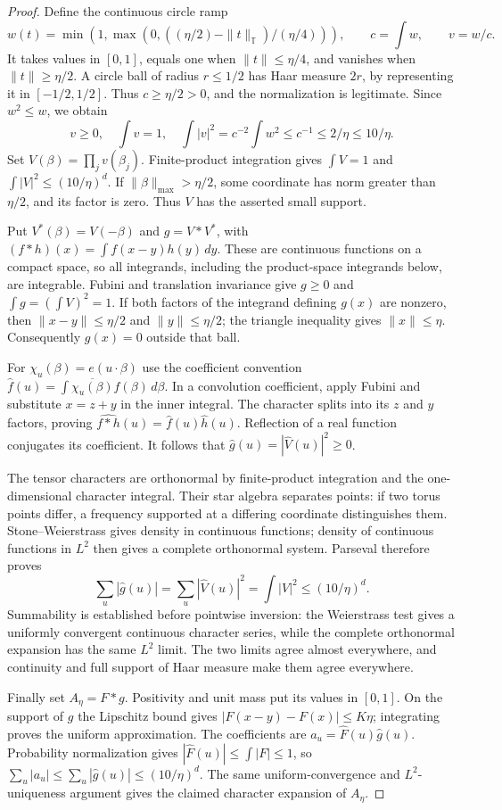 \begin{proof}
Define the continuous circle ramp
\[
 w(t)=\min(1,\max(0,((\eta/2)-\|t\|_{\mathbb T})/(\eta/4))),
 \qquad c=\int w,\qquad v=w/c.
\]
It takes values in $[0,1]$, equals one when $\|t\|\leq\eta/4$, and
vanishes when $\|t\|\geq\eta/2$.  A circle ball of radius
$r\leq1/2$ has Haar measure $2r$, by representing it in $[-1/2,1/2]$.
Thus $c\geq\eta/2>0$, and the normalization is legitimate.
Since $w^2\leq w$, we obtain
\[
 v\geq0,\quad\int v=1,\quad
 \int|v|^2=c^{-2}\int w^2\leq c^{-1}\leq2/\eta\leq10/\eta.
\]
Set $V(\beta)=\prod_jv(\beta_j)$.  Finite-product integration gives
$\int V=1$ and $\int|V|^2\leq(10/\eta)^d$.
If $\|\beta\|_{\max}>\eta/2$, some coordinate has norm greater than
$\eta/2$, and its factor is zero.  Thus $V$ has the asserted small support.

Put $V^*(\beta)=V(-\beta)$ and $g=V*V^*$, with
$(f*h)(x)=\int f(x-y)h(y)\,dy$.
These are continuous functions on a compact space, so all integrands,
including the product-space integrands below, are integrable.
Fubini and translation invariance give $g\geq0$ and $\int g=(\int V)^2=1$.
If both factors of the integrand defining $g(x)$ are nonzero, then
$\|x-y\|\leq\eta/2$ and $\|y\|\leq\eta/2$; the triangle inequality gives
$\|x\|\leq\eta$.  Consequently $g(x)=0$ outside that ball.

For $\chi_u(\beta)=e(u\cdot\beta)$ use the coefficient convention
$\widehat f(u)=\int\overline{\chi_u(\beta)}f(\beta)\,d\beta$.
In a convolution coefficient, apply Fubini and substitute $x=z+y$ in
the inner integral.  The character splits into its $z$ and $y$ factors,
proving $\widehat{f*h}(u)=\widehat f(u)\widehat h(u)$.
Reflection of a real function conjugates its coefficient.  It follows that
$\widehat g(u)=|\widehat V(u)|^2\geq0$.

The tensor characters are orthonormal by finite-product integration and
the one-dimensional character integral.  Their star algebra separates
points: if two torus points differ, a frequency supported at a differing
coordinate distinguishes them.  Stone--Weierstrass gives density in
continuous functions; density of continuous functions in $L^2$ then gives
a complete orthonormal system.  Parseval therefore proves
\[
 \sum_u|\widehat g(u)|=\sum_u|\widehat V(u)|^2
       =\int|V|^2\leq(10/\eta)^d.
\]
Summability is established before pointwise inversion: the Weierstrass
test gives a uniformly convergent continuous character series, while the
complete orthonormal expansion has the same $L^2$ limit.  The two limits
agree almost everywhere, and continuity and full support of Haar measure
make them agree everywhere.

Finally set $A_\eta=F*g$.  Positivity and unit mass put its values in
$[0,1]$.  On the support of $g$ the Lipschitz bound gives
$|F(x-y)-F(x)|\leq K\eta$; integrating proves the uniform approximation.
The coefficients are $a_u=\widehat F(u)\widehat g(u)$.
Probability normalization gives $|\widehat F(u)|\leq\int|F|\leq1$, so
$\sum_u|a_u|\leq\sum_u|\widehat g(u)|\leq(10/\eta)^d$.
The same uniform-convergence and $L^2$-uniqueness argument gives the
claimed character expansion of $A_\eta$.
\end{proof}

